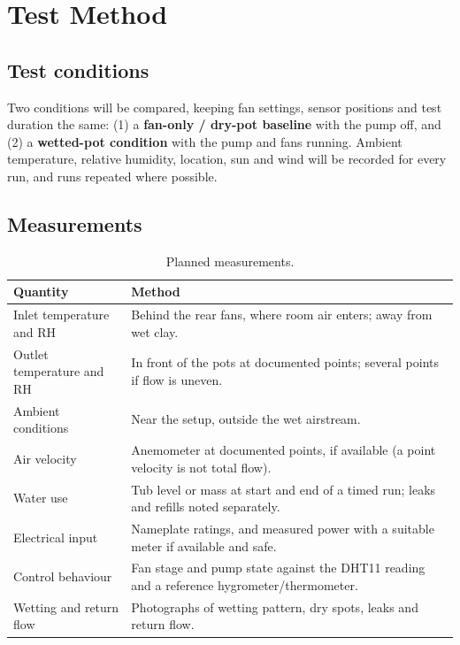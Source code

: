 \documentclass[11pt,a4paper]{report}
\begin{document}
\chapter{Test Method}
\label{ch:testing}

\section{Test conditions}
Two conditions will be compared, keeping fan settings, sensor positions and test duration the same: (1) a \textbf{fan-only / dry-pot baseline} with the pump off, and (2) a \textbf{wetted-pot condition} with the pump and fans running. Ambient temperature, relative humidity, location, sun and wind will be recorded for every run, and runs repeated where possible.

\section{Measurements}
\begin{table}[H]
\centering
\caption{Planned measurements.}
\label{tab:measure}
\small
\begin{tabularx}{\linewidth}{@{}>{\raggedright\arraybackslash}p{3.6cm}>{\raggedright\arraybackslash}X@{}}
\toprule
\textbf{Quantity} & \textbf{Method} \\
\midrule
Inlet temperature and RH & Behind the rear fans, where room air enters; away from wet clay. \\
Outlet temperature and RH & In front of the pots at documented points; several points if flow is uneven. \\
Ambient conditions & Near the setup, outside the wet airstream. \\
Air velocity & Anemometer at documented points, if available (a point velocity is not total flow). \\
Water use & Tub level or mass at start and end of a timed run; leaks and refills noted separately. \\
Electrical input & Nameplate ratings, and measured power with a suitable meter if available and safe. \\
Control behaviour & Fan stage and pump state against the DHT11 reading and a reference hygrometer/thermometer. \\
Wetting and return flow & Photographs of wetting pattern, dry spots, leaks and return flow. \\
\bottomrule
\end{tabularx}
\end{table}
\end{document}
